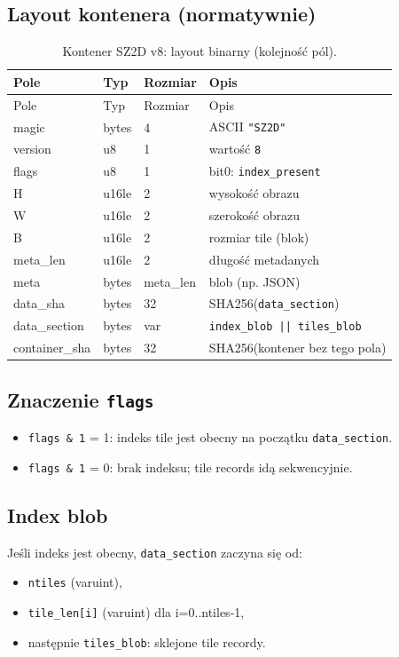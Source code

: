 \documentclass[11pt,a4paper]{article}
\begin{document}
\subsection{Layout kontenera (normatywnie)}
\begin{longtable}{@{}llll@{}}
\caption{Kontener SZ2D v8: layout binarny (kolejność pól).}
\label{tab:container_layout}\\
\toprule
Pole & Typ & Rozmiar & Opis \\
\midrule
\endfirsthead
\toprule
Pole & Typ & Rozmiar & Opis \\
\midrule
\endhead
\bottomrule
\endfoot

magic & bytes & 4 & ASCII \texttt{"SZ2D"} \\
version & u8 & 1 & wartość \texttt{8} \\
flags & u8 & 1 & bit0: \texttt{index\_present} \\
H & u16le & 2 & wysokość obrazu \\
W & u16le & 2 & szerokość obrazu \\
B & u16le & 2 & rozmiar tile (blok) \\
meta\_len & u16le & 2 & długość metadanych \\
meta & bytes & meta\_len & blob (np. JSON) \\
data\_sha & bytes & 32 & SHA256(\texttt{data\_section}) \\
data\_section & bytes & var & \texttt{index\_blob || tiles\_blob} \\
container\_sha & bytes & 32 & SHA256(kontener bez tego pola) \\
\end{longtable}

\subsection{Znaczenie \texttt{flags}}
\begin{itemize}
  \item \texttt{flags \& 1} = 1: indeks tile jest obecny na początku \texttt{data\_section}.
  \item \texttt{flags \& 1} = 0: brak indeksu; tile records idą sekwencyjnie.
\end{itemize}

\subsection{Index blob}
Jeśli indeks jest obecny, \texttt{data\_section} zaczyna się od:
\begin{itemize}
  \item \texttt{ntiles} (varuint),
  \item \texttt{tile\_len[i]} (varuint) dla i=0..ntiles-1,
  \item następnie \texttt{tiles\_blob}: sklejone tile recordy.
\end{itemize}
\end{document}
